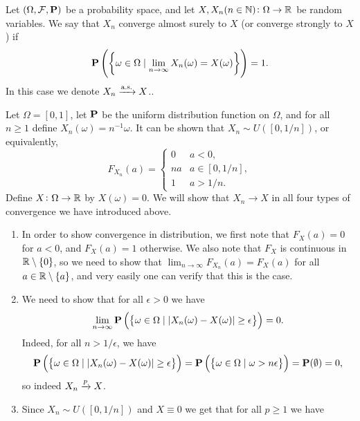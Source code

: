 \documentclass[11pt,a4paper]{article}
\newcommand{\as}{\text{a.s.}}
\begin{document}
\begin{definition}
  Let $(\Omega, \mathcal F, \mathbf{P})$ be a probability space, and let
  $X,X_n(n \in \mathbb{N}) \colon \Omega \to \mathbb{R}$ be random variables.
  We say that $X_n$ converge almost surely to $X$
  (or converge strongly to $X$) if
  \[
    \Prob\del{\set{\omega \in \Omega \mid \lim_{n \to \infty} X_n(\omega) = X(\omega)}} = 1.
  \]
  In this case we denote $X_n \taking{\as} X$..
\end{definition}

\begin{example}
  Let $\Omega = [0,1]$,
  let $\mathbf{P}$ be the uniform distribution function on $\Omega$,
  and for all $n \geq 1$ define $X_n(\omega) = n^{-1} \omega$.
  It can be shown that $X_n \sim U([0,1/n])$,
  or equivalently,
  \[
    F_{X_n}(a) =
    \begin{cases}
      0 &a < 0, \\
      na &a \in [0,1/n], \\
      1 &a > 1/n.
    \end{cases}
  \]
  Define $X \colon \Omega \to \mathbb{R}$ by $X(\omega) = 0$.
  We will show that $X_n \to X$ in all four types of convergence
  we have introduced above.
  \begin{enumerate}
    \item[($X_n \taking{d} X$)]
      In order to show convergence in distribution,
      we first note that $F_X(a) = 0$ for $a < 0$, and $F_X(a) = 1$ otherwise.
      We also note that $F_X$ is continuous in $\mathbb{R} \setminus \left\{0\right\}$,
      so we need to show that $\lim_{n \to \infty} F_{X_n}(a) = F_X(a)$
      for all $a \in \mathbb{R} \setminus \left\{a\right\}$,
      and very easily one can verify that this is the case.
    \item[($X_n \taking{p} X$)] We need to show that
      for all $\epsilon > 0$ we have
      \[
        \lim_{n \to \infty}
          \mathbf{P}\left(\left\{\omega \in \Omega \mid
          |X_n(\omega) - X(\omega)| \geq \epsilon\right\}\right) = 0.
      \]
      Indeed, for all $n > 1/\epsilon$, we have
      \[
        \mathbf{P}\left(\left\{\omega \in \Omega \mid
          |X_n(\omega) - X(\omega)| \geq \epsilon\right\}\right) =
        \mathbf{P}\left(\left\{\omega \in \Omega \mid
          \omega > n\epsilon\right\}\right) =
        \mathbf{P}(\emptyset) = 0,
      \]
      so indeed $X_n \taking{p} X$.
    \item[($X_n \taking{\mathcal L^p} X$)]
      Since $X_n \sim U([0,1/n])$ and $X \equiv 0$ we get that
      for all $p \geq 1$ we have
      \begin{multline*}

\end{multline*}
\end{enumerate}
\end{example}
\end{document}
